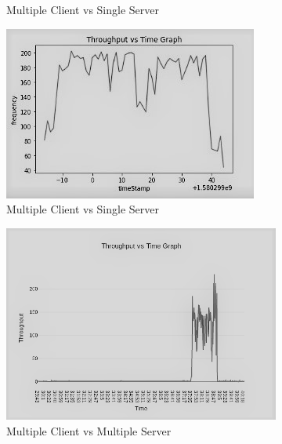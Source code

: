 \documentclass[11pt]{article}
\begin{document}
\begin{figure}[H]
\begin{subfigure}{0.40\textwidth}
      \caption{Multiple Client vs Single Server}
      \label{fig:2}
    \end{subfigure}
    \hfil
    \begin{subfigure}{0.40\textwidth}
      \includegraphics[width=\linewidth]{2-2}
      \caption{Multiple Client vs Single Server}
      \label{fig:5}
    \end{subfigure}
    \medskip
    \begin{subfigure}{0.40\textwidth}
      \includegraphics[width=\linewidth]{1-3}
      \caption{Multiple Client vs Multiple Server}
      \label{fig:3}
    \end{subfigure}
    \hfil
    \begin{subfigure}{0.40\textwidth}

\end{subfigure}
\end{figure}
\end{document}
